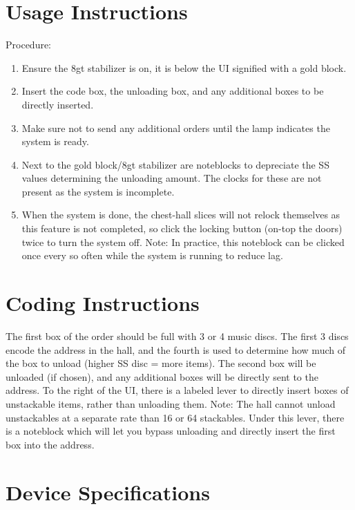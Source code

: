\documentclass[10pt]{datasheet}
\begin{document}
\onecolumn

\section{Usage Instructions}
Procedure:
\begin{enumerate}
    \item Ensure the 8gt stabilizer is on, it is below the UI signified with a gold block.
    \item Insert the code box, the unloading box, and any additional boxes to be directly inserted.
    \item Make sure not to send any additional orders until the lamp indicates the system is ready.
    \item Next to the gold block/8gt stabilizer are noteblocks to depreciate the SS values determining the unloading amount. The clocks for these are not present as the system is incomplete.
    \item When the system is done, the chest-hall slices will not relock themselves as this feature is not completed, so click the locking button (on-top the doors) twice to turn the system off. Note: In practice, this noteblock can be clicked once every so often while the system is running to reduce lag.
\end{enumerate}

\section{Coding Instructions}

The first box of the order should be full with 3 or 4 music discs. The first 3 discs encode the address in the hall, and the fourth is used to determine how much of the box to unload (higher SS disc = more items). 
The second box will be unloaded (if chosen), and any additional boxes will be directly sent to the address.
To the right of the UI, there is a labeled lever to directly insert boxes of unstackable items, rather than unloading them. Note: The hall cannot unload unstackables at a separate rate than 16 or 64 stackables. 
Under this lever, there is a noteblock which will let you bypass unloading and directly insert the first box into the address.

\newpage

\section{Device Specifications}
\end{document}
